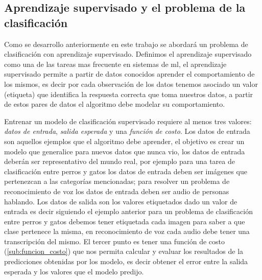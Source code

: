 \subsection{Aprendizaje supervisado y el problema de la clasificación}\label{sub:aprendizaje_supervisado}

Como se desarrollo anteriormente en este trabajo se abordará un problema de clasificación con aprendizaje supervisado. Definimos  el aprendizaje supervisado como una de las tareas mas frecuente en sistemas de \ac{ml}, el aprendizaje supervisado permite a partir de datos conocidos aprender el comportamiento de los mismos, es decir por cada observación de los datos tenemos asociado un valor (etiqueta) que identifica la respuesta correcta que toma nuestros datos, a partir de estos pares de datos el algoritmo debe modelar su comportamiento. 


Entrenar un modelo de clasificación supervisado requiere al menos tres valores:  \textit{datos de entrada}, \textit{salida esperada} y una \textit{función de costo}.  Los datos de entrada son aquellos ejemplos que el algoritmo debe aprender, el objetivo es crear un modelo que generalice para nuevos datos que nunca vio, los datos de entrada deberán ser representativo del mundo real, por ejemplo para una tarea de clasificación entre perros y gatos los datos de entrada deben ser imágenes que pertenezcan a las categorías mencionadas; para resolver un problema de reconocimiento de voz los datos de entrada deben ser audio de personas hablando. Los datos de salida son los valores etiquetados dado un valor de entrada es decir siguiendo el ejemplo anterior para un problema de clasificación entre perros y gatos debemos tener etiquetada cada imagen para saber a que clase pertenece la misma, en reconocimiento de voz cada audio debe tener una transcripción del mismo. El tercer punto es tener una función de costo (\ref{sub:funcion_costo}) que nos permita calcular y evaluar  los resultados de la predicciones obtenidas por los modelo, es decir obtener el error entre la salida esperada y los valores que el modelo predijo.

